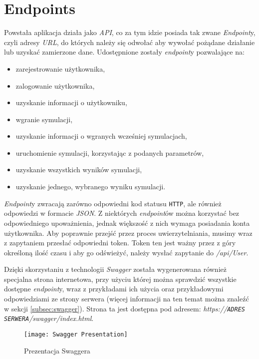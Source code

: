 \section{Endpoints}

\par Powstała aplikacja działa jako \emph{API}, co za tym idzie posiada tak zwane \emph{Endpoint}y, czyli adresy \emph{URL}, do których należy się odwołać aby wywołać pożądane działanie lub uzyskać zamierzone dane. Udostępnione zostały \emph{endpoint}y pozwalające na:
\begin{itemize}
	\item zarejestrowanie użytkownika,
	\item zalogowanie użytkownika,
	\item uzyskanie informacji o użytkowniku,
	\item wgranie symulacji,
	\item uzyskanie informacji o wgranych wcześniej symulacjach,
	\item uruchomienie symulacji, korzystając z podanych parametrów,
	\item uzyskanie wszystkich wyników symulacji,
	\item uzyskanie jednego, wybranego wyniku symulacji.
\end{itemize}

\par \emph{Endpoint}y zwracają zarówno odpowiedni kod statusu \texttt{HTTP}, ale również odpowiedzi w formacie \emph{JSON}. Z niektórych \emph{endpoint}ów można korzystać bez odpowiedniego upoważnienia, jednak większość z nich wymaga posiadania konta użytkownika. Aby poprawnie przejść przez proces uwierzytelniania, musimy wraz z zapytaniem przesłać odpowiedni token. Token ten jest ważny przez z góry określoną ilość czasu i aby go odświeżyć, należy wysłać zapytanie do \emph{/api/User}.

\par Dzięki skorzystaniu z technologii \emph{Swagger} została wygenerowana również specjalna strona internetowa, przy użyciu której można sprawdzić wszystkie dostępne \emph{endpoint}y, wraz z przykładami ich użycia oraz przykładowymi odpowiedziami ze strony serwera (więcej informacji na ten temat można znaleźć w sekcji \ref{subsec:swagger}). Strona ta jest dostępna pod adresem: \emph{https://\texttt{ADRES SERWERA}/swagger/index.html}.

\begin{figure}[H]
	\texttt{[image: Swagger Presentation]}
	\caption{Prezentacja Swaggera}
\end{figure}


